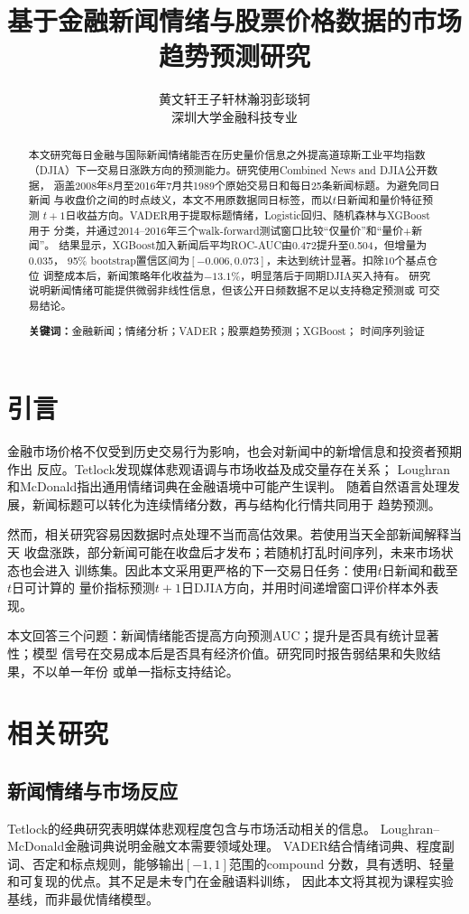 \documentclass[UTF8,a4paper,9.5pt,fontset=none]{ctexart}
\title{\vspace{-1cm}\textbf{基于金融新闻情绪与股票价格数据的市场趋势预测研究}}
\author{黄文轩\quad 王子轩\quad 林瀚羽\quad 彭琰轲\\深圳大学金融科技专业}
\date{}
\begin{document}
\maketitle
\vspace{-1.6em}
\begin{abstract}
本文研究每日金融与国际新闻情绪能否在历史量价信息之外提高道琼斯工业平均指数
（DJIA）下一交易日涨跌方向的预测能力。研究使用Combined News and DJIA公开数据，
涵盖2008年8月至2016年7月共1989个原始交易日和每日25条新闻标题。为避免同日新闻
与收盘价之间的时点歧义，本文不用原数据同日标签，而以$t$日新闻和量价特征预测
$t+1$日收益方向。VADER用于提取标题情绪，Logistic回归、随机森林与XGBoost用于
分类，并通过2014--2016年三个walk-forward测试窗口比较“仅量价”和“量价+新闻”。
结果显示，XGBoost加入新闻后平均ROC-AUC由0.472提升至0.504，但增量为0.035，
95\% bootstrap置信区间为$[-0.006,0.073]$，未达到统计显著。扣除10个基点仓位
调整成本后，新闻策略年化收益为$-13.1\%$，明显落后于同期DJIA买入持有。
研究说明新闻情绪可能提供微弱非线性信息，但该公开日频数据不足以支持稳定预测或
可交易结论。

\noindent\textbf{关键词：}金融新闻；情绪分析；VADER；股票趋势预测；XGBoost；
时间序列验证
\end{abstract}

\section{引言}
金融市场价格不仅受到历史交易行为影响，也会对新闻中的新增信息和投资者预期作出
反应。Tetlock发现媒体悲观语调与市场收益及成交量存在关系\cite{tetlock}；
Loughran和McDonald指出通用情绪词典在金融语境中可能产生误判\cite{lm}。
随着自然语言处理发展，新闻标题可以转化为连续情绪分数，再与结构化行情共同用于
趋势预测。

然而，相关研究容易因数据时点处理不当而高估效果。若使用当天全部新闻解释当天
收盘涨跌，部分新闻可能在收盘后才发布；若随机打乱时间序列，未来市场状态也会进入
训练集。因此本文采用更严格的下一交易日任务：使用$t$日新闻和截至$t$日可计算的
量价指标预测$t+1$日DJIA方向，并用时间递增窗口评价样本外表现。

本文回答三个问题：新闻情绪能否提高方向预测AUC；提升是否具有统计显著性；模型
信号在交易成本后是否具有经济价值。研究同时报告弱结果和失败结果，不以单一年份
或单一指标支持结论。

\section{相关研究}
\subsection{新闻情绪与市场反应}
Tetlock的经典研究表明媒体悲观程度包含与市场活动相关的信息\cite{tetlock}。
Loughran--McDonald金融词典说明金融文本需要领域处理\cite{lm}。
VADER结合情绪词典、程度副词、否定和标点规则，能够输出$[-1,1]$范围的compound
分数，具有透明、轻量和可复现的优点\cite{vader}。其不足是未专门在金融语料训练，
因此本文将其视为课程实验基线，而非最优情绪模型。
\end{document}
